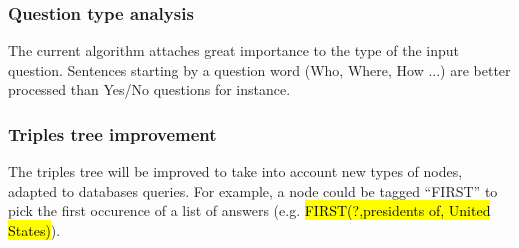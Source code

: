 \subsubsection{Question type analysis}

The current algorithm attaches great importance to the type of the input question. Sentences starting by a question word (Who, Where, How ...) are better processed than Yes/No questions for instance.

\subsubsection{Triples tree improvement}

The triples tree will be improved to take into account new types of nodes, adapted to databases queries. For example, a node could be tagged ``FIRST'' to pick the first occurence of a list of answers (e.g. \hl{FIRST(?,presidents of, United States)}).
